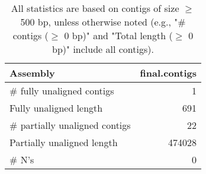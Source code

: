 \documentclass[12pt,a4paper]{article}
\begin{document}
\begin{table}[ht]
\begin{center}
\caption{All statistics are based on contigs of size $\geq$ 500 bp, unless otherwise noted (e.g., "\# contigs ($\geq$ 0 bp)" and "Total length ($\geq$ 0 bp)" include all contigs).}
\begin{tabular}{|l*{1}{|r}|}
\hline
Assembly & final.contigs \\ \hline
\# fully unaligned contigs & 1 \\ \hline
Fully unaligned length & 691 \\ \hline
\# partially unaligned contigs & 22 \\ \hline
Partially unaligned length & 474028 \\ \hline
\# N's & 0 \\ \hline
\end{tabular}
\end{center}
\end{table}
\end{document}
